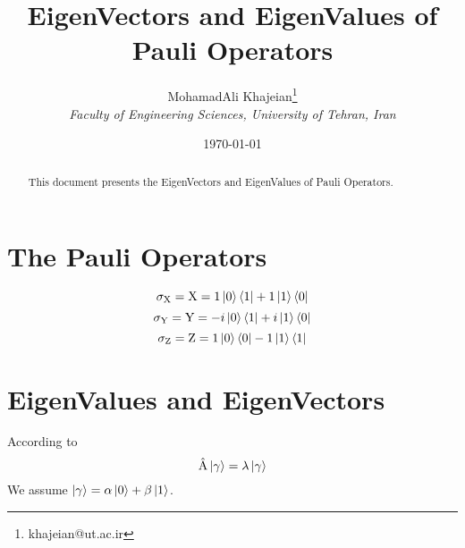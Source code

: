 \documentclass[12pt]{article}
\title{\textbf{EigenVectors and EigenValues of Pauli Operators}}
\author{
    MohamadAli Khajeian\footnote{khajeian@ut.ac.ir} \\ 
    \small \textit{Faculty of Engineering Sciences, University of Tehran, Iran} \\ 
}
\date{\today}
\begin{document}
\maketitle

\begin{abstract}
    This document presents the EigenVectors and EigenValues of Pauli Operators.
\end{abstract}

\section{The Pauli Operators}

\begin{equation}
\label{eq:1}
\sigma_{\textnormal{X}} = \textnormal{X} = 1\ket{0}\bra{1} + 1\ket{1}\bra{0}
\end{equation}
\begin{equation}
\label{eq:2}
\sigma_{\textnormal{Y}} = \textnormal{Y} = -i\ket{0}\bra{1} + i\ket{1}\bra{0}
\end{equation}
\begin{equation}
\label{eq:3}
\sigma_{\textnormal{Z}} = \textnormal{Z} = 1\ket{0}\bra{0} -1\ket{1}\bra{1}
\end{equation}

\section{EigenValues and EigenVectors}
According to
\begin{equation}
    \label{eq:ref}
    \hat{\textnormal{A}}\ket{\gamma} = \lambda\ket{\gamma}
\end{equation}
We assume $\ket{\gamma} = \alpha\ket{0}+\beta\ket{1}$.
\end{document}
